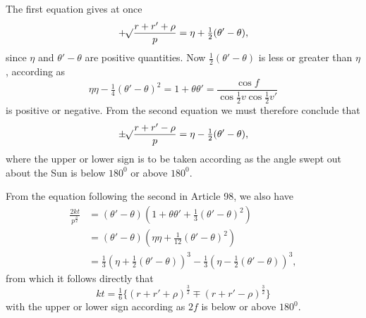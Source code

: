 \par
The first equation gives at once
\[
+\mathord{{}^{}\!\surd}\frac{r+r'+\rho}{p}=\eta+\tfrac12(\theta'-\theta),
\]
\noindent since $\eta$ and $\theta'-\theta$ are positive quantities. Now $\tfrac12(\theta'-\theta)$ is less or greater than $\eta$, according as
\[
\eta\eta-\tfrac14(\theta'-\theta)^2=1+\theta\theta'=\frac{\cos f}{\cos\tfrac12v\cos\tfrac12v'}
\]
\noindent is positive or negative. From the second equation we must therefore conclude that
\[
\pm\mathord{{}^{}\!\surd}\frac{r+r'-\rho}{p}=\eta-\tfrac12(\theta'-\theta),
\]
\noindent where the upper or lower sign is to be taken according as the angle swept out about the Sun is below $180^0$ or above $180^0$.
\par
From the equation following the second in Article 98, we also have
\[
\begin{aligned}
\frac{2kt}{p^{\frac32}}&=(\theta'-\theta)(1+\theta\theta'+\tfrac13(\theta'-\theta)^2)\\[.6em]
&=(\theta'-\theta)(\eta\eta+\tfrac1{12}(\theta'-\theta)^2)\\[.6em]
&=\tfrac13(\eta+\tfrac12(\theta'-\theta))^3-\tfrac13(\eta-\tfrac12(\theta'-\theta))^3,
\end{aligned}
\]
\begingroup{}
\noindent from which it follows directly that
\[
kt=\tfrac16\{(r+r'+\rho)^{\frac32}\mp(r+r'-\rho)^{\frac32}\}
\]
\noindent with the upper or lower sign according as $2f$ is below or above $180^0$.\endgroup
{}

